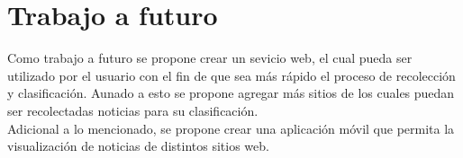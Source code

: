 \section[T. Futuro]{Trabajo a futuro}

Como trabajo a futuro se propone crear un sevicio web, el cual pueda ser utilizado por el usuario con el fin de que sea más rápido el proceso de recolección y clasificación. Aunado a esto se propone agregar más sitios de los cuales puedan ser recolectadas noticias para su clasificación.\\
Adicional a lo mencionado, se propone crear una aplicación móvil que permita la visualización de noticias de distintos sitios web.
